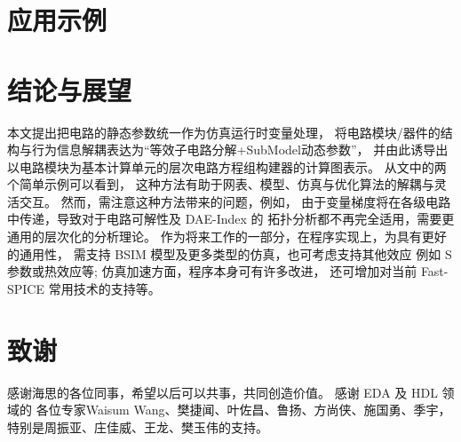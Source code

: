 \documentclass[a4paper,12pt]{ctexart}
\begin{document}
\section{应用示例}\label{sec:applications}


\section{结论与展望}
本文提出把电路的静态参数统一作为仿真运行时变量处理，
将电路模块/器件的结构与行为信息解耦表达为“等效子电路分解+SubModel动态参数”，
并由此诱导出以电路模块为基本计算单元的层次电路方程组构建器的计算图表示。
从文中的两个简单示例可以看到，
这种方法有助于网表、模型、仿真与优化算法的解耦与灵活交互。
然而，需注意这种方法带来的问题，例如，
由于变量梯度将在各级电路中传递，导致对于电路可解性及 DAE-Index 的
拓扑分析都不再完全适用，需要更通用的层次化的分析理论。
作为将来工作的一部分，在程序实现上，为具有更好的通用性，
需支持 BSIM 模型及更多类型的仿真，也可考虑支持其他效应
例如 S 参数或热效应等; 仿真加速方面，程序本身可有许多改进，
还可增加对当前 Fast-SPICE 常用技术的支持等。

\section*{致谢}
感谢海思的各位同事，希望以后可以共事，共同创造价值。 感谢 EDA 及 HDL 领域的
各位专家Waisum Wang、樊捷闻、叶佐昌、鲁扬、方尚侠、施国勇、季宇，
特别是周振亚、庄佳威、王龙、樊玉伟的支持。




\end{document}
